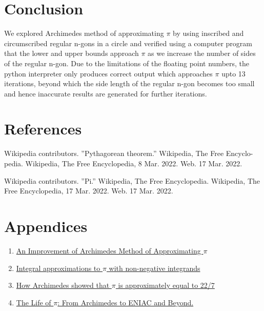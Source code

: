 \documentclass[12pt]{article}
\begin{document}
\section {Conclusion}
We explored Archimedes method of approximating $\pi$ by using inscribed and
circumscribed regular n-gons in a circle and verified using a computer program
that the lower and upper bounds approach $\pi$ as we increase the number of
sides of the regular n-gon. Due to the limitations of the floating point numbers,
the python interpreter only produces correct output which approaches $\pi$
upto 13 iterations, beyond which the side length of the regular n-gon becomes
too small and hence inaccurate results are generated for further iterations.


\section {References}

Wikipedia contributors. ”Pythagorean theorem.” Wikipedia, The Free Encyclo-
pedia. Wikipedia, The Free Encyclopedia, 8 Mar. 2022. Web. 17 Mar. 2022.

\bigskip
Wikipedia contributors. ”Pi.” Wikipedia, The Free Encyclopedia. Wikipedia,
The Free Encyclopedia, 17 Mar. 2022. Web. 17 Mar. 2022.


\section {Appendices}
\begin{enumerate}[label=(\Alph*)]
\item \href{https://ijpam.eu/contents/2003-7-2/4/4.pdf}{An Improvement of Archimedes Method of Approximating $\pi$}
\item \href{http://educ.jmu.edu/~lucassk/Papers/more\%20on\%20pi.pdf}{Integral approximations to $\pi$ with non-negative integrands}
\item \href{https://arxiv.org/ftp/arxiv/papers/2008/2008.07995.pdf}{How Archimedes showed that $\pi$ is approximately equal to 22/7}
\item \href{https://link.springer.com/chapter/10.1007/978-3-642-36736-6_24}{The Life of $\pi$: From Archimedes to ENIAC and Beyond.}
\end{enumerate}
\end{document}
